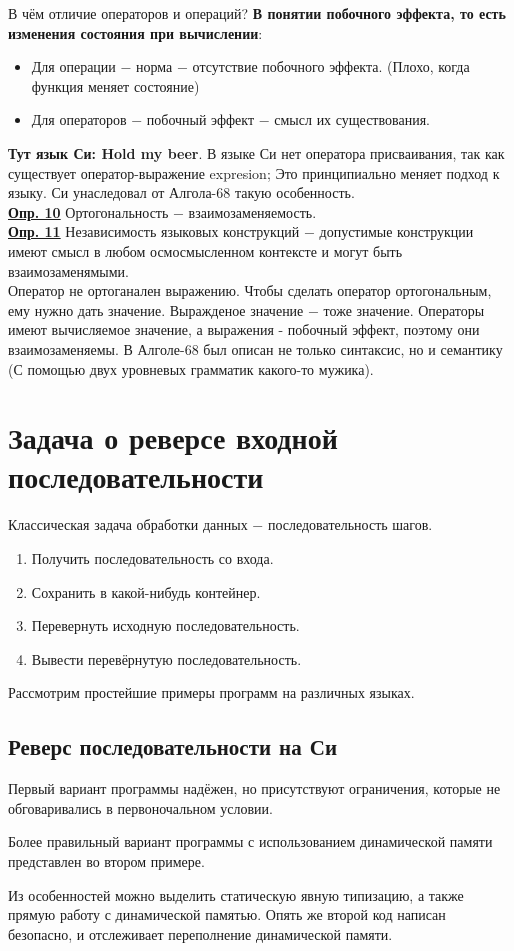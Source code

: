 \documentclass[a4paper, 12pt, titlepage, finall]{extreport}
\begin{document}
        В чём отличие операторов и операций? {\bf В понятии побочного эффекта, то есть изменения состояния при вычислении}:
        \begin{itemize}
            \item Для операции $-$ норма $-$ отсутствие побочного эффекта. (Плохо, когда функция меняет состояние)
            \item Для операторов $-$ побочный эффект $-$ смысл их существования.
        \end{itemize}
        {\bf Тут язык Си: Hold my beer}.
        В языке Си нет оператора присваивания, так как существует оператор-выражение expresion;
        Это принципиально меняет подход к языку. Си унаследовал от Алгола-68 такую особенность.\\
        \underline{\bf Опр. 10} Ортогональность $-$ взаимозаменяемость.\\
        \underline{\bf Опр. 11} Независимость языковых конструкций $-$ допустимые конструкции имеют смысл в любом осмосмысленном контексте и могут быть взаимозаменямыми.\\
        Оператор не ортоганален выражению.
        Чтобы сделать оператор ортогональным, ему нужно дать значение. Выражденое значение $-$ тоже значение.
        Операторы имеют вычисляемое значение, а выражения - побочный эффект, поэтому они взаимозаменяемы.
        В Алголе-68 был описан не только синтаксис, но и семантику (С помощью двух уровневых грамматик какого-то мужика).

        \section{Задача о реверсе входной последовательности}
            Классическая задача обработки данных $-$ последовательность шагов.

            \begin{enumerate}
                \item Получить последовательность со входа.
                \item Сохранить в какой-нибудь контейнер.
                \item Перевернуть исходную последовательность.
                \item Вывести перевёрнутую последовательность.
            \end{enumerate}

        Рассмотрим простейшие примеры программ на различных языках.
        \subsection{Реверс последовательности на Си}
            Первый вариант программы надёжен, но присутствуют ограничения, которые не обговаривались в первоночальном условии.
            
            Более правильный вариант программы с использованием динамической памяти представлен во втором примере.
            
            Из особенностей можно выделить статическую явную типизацию, а также прямую работу с динамической памятью.
            Опять же второй код написан безопасно, и отслеживает переполнение динамической памяти.
\end{document}
